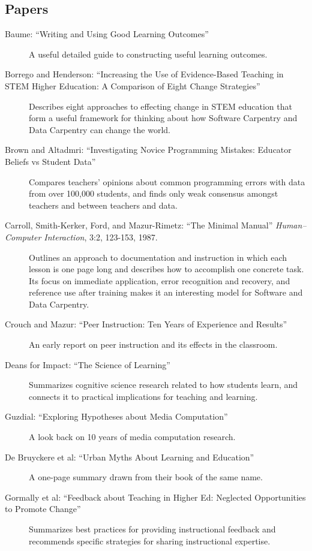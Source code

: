 \subsection{Papers}\label{papers}

\begin{description}
\item[Baume:
``Writing and Using Good Learning Outcomes'']
A useful detailed guide to constructing useful learning outcomes.
\item[Borrego and Henderson:
``Increasing the Use of Evidence-Based Teaching in STEM Higher Education: A Comparison of Eight Change Strategies'']
Describes eight approaches to effecting change in STEM education that
form a useful framework for thinking about how Software Carpentry and
Data Carpentry can change the world.
\item[Brown and Altadmri:
``Investigating Novice Programming Mistakes: Educator Beliefs vs Student Data'']
Compares teachers' opinions about common programming errors with data
from over 100,000 students, and finds only weak consensus amongst
teachers and between teachers and data.
\item[Carroll, Smith-Kerker, Ford, and Mazur-Rimetz:
``The Minimal Manual'' \emph{Human--Computer Interaction}, 3:2, 123-153, 1987.]
Outlines an approach to documentation and instruction in which each
lesson is one page long and describes how to accomplish one concrete
task. Its focus on immediate application, error recognition and
recovery, and reference use after training makes it an interesting model
for Software and Data Carpentry.
\item[Crouch and Mazur:
``Peer Instruction: Ten Years of Experience and Results'']
An early report on peer instruction and its effects in the classroom.
\item[Deans for Impact:
``The Science of Learning'']
Summarizes cognitive science research related to how students learn, and
connects it to practical implications for teaching and learning.
\item[Guzdial:
``Exploring Hypotheses about Media Computation'']
A look back on 10 years of media computation research.
\item[De Bruyckere et al:
``Urban Myths About Learning and Education'']
A one-page summary drawn from their book of the same name.
\item[Gormally et al:
``Feedback about Teaching in Higher Ed: Neglected Opportunities to Promote Change'']
Summarizes best practices for providing instructional feedback and
recommends specific strategies for sharing instructional expertise.

\end{description}
